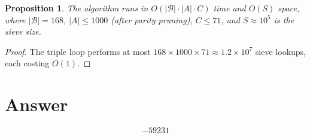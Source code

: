 \documentclass[12pt,a4paper]{article}
\newtheorem{proposition}[theorem]{Proposition}
\theoremstyle{definition}
\theoremstyle{remark}
\begin{document}
\begin{proposition}
The algorithm runs in $O(|\mathcal{B}| \cdot |A| \cdot C)$ time and $O(S)$ space, where $|\mathcal{B}| = 168$, $|A| \leq 1000$ (after parity pruning), $C \leq 71$, and $S \approx 10^5$ is the sieve size.
\end{proposition}

\begin{proof}
The triple loop performs at most $168 \times 1000 \times 71 \approx 1.2 \times 10^7$ sieve lookups, each costing $O(1)$.
\end{proof}

\section{Answer}

\[
\boxed{-59231}
\]
\end{document}
